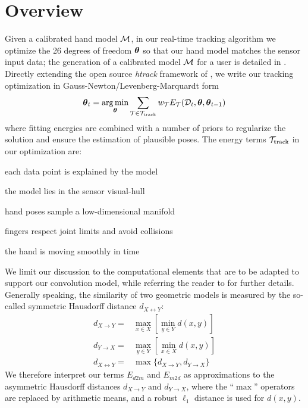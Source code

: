 
\section{Overview}
\label{sec:overview}
Given a calibrated hand model $\mathcal{M}$, in our real-time tracking algorithm we optimize the 26 degrees of freedom $\boldsymbol{\theta}$ so that our hand model matches the sensor input data; the generation of a calibrated model $\mathcal{M}$ for a user is detailed in . Directly extending the open source \emph{htrack} framework of \cite{tagliasacchi2015robust}, we write our tracking optimization in Gauss-Newton/Levenberg-Marquardt form
% 
\begin{eqnarray}
\boldsymbol{\theta}_t = \operatorname*{arg\,min}_{\boldsymbol{\theta}}
\sum_{\mathcal{T} \in {\mathcal{T}_\text{track}}} 
w_\mathcal{T} E_\mathcal{T}(\mathcal{D}_t,\boldsymbol{\theta},\boldsymbol{\theta}_{t-1})
\label{eq:htrack}
\end{eqnarray}
% 
where fitting energies are combined with a number of priors to regularize the solution and ensure the estimation of plausible poses. The energy terms ${\mathcal{T}_\text{track}}$ in our optimization are:
% 
\begin{description}[labelsep=0em,labelwidth=.6in,labelindent=.25cm]
    \item[d2m] each data point is explained by the model
    \item[m2d] the model lies in the sensor visual-hull
    \item[pose] hand poses sample a low-dimensional manifold
    \item[kinematic] fingers respect joint limits and avoid collisions
    \item[temporal] the hand is moving smoothly in time
\end{description}
% 
We limit our discussion to the computational elements that are to be adapted to support our convolution model, while referring the reader to \cite{tagliasacchi2015robust} for further details. 
% 
Generally speaking, the similarity of two geometric models is measured by the so-called symmetric Hausdorff distance $d_{X \leftrightarrow Y}$:
% 
\begin{eqnarray*}
d_{X \rightarrow Y} =& \max_{x \in X} \left[ \min_{y \in Y} d(x,y) \right] \\
d_{Y \rightarrow X} =& \max_{y \in Y} \left[ \min_{x \in X} d(x,y) \right] \\
d_{X \leftrightarrow Y} =& \max \{ d_{X \rightarrow Y}, d_{Y \rightarrow X} \}
\end{eqnarray*}
We therefore interpret our terms $E_{d2m}$ and $E_{m2d}$ as approximations to the asymmetric Hausdorff distances $d_{X \rightarrow Y}$ and $d_{Y \rightarrow X}$, where the  ``$\max$'' operators are replaced by arithmetic means, and a robust $\ell_1$ distance is used for $d(x,y)$. 

